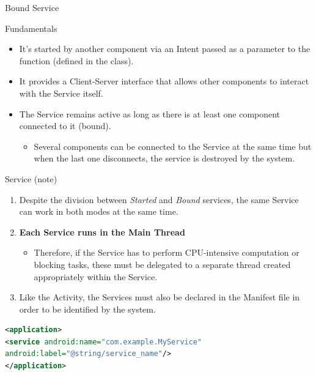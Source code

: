 \documentclass{beamer}
\begin{document}
  \begin{frame}{Bound Service}
    \begin{block}{Fundamentals}
      \begin{itemize}\itemsep10pt
        \item It's started by another component via an Intent passed as a
        parameter to the  function (defined in the  class).
        \item It provides a Client-Server interface that allows other components
        to interact with the Service itself.
        \item The Service remains active as long as there is at least one
        component connected to it (bound).
        \begin{itemize}
          \item Several components can be connected to the Service at the same
          time but when the last one disconnects, the service is destroyed by
          the system.
        \end{itemize}
      \end{itemize}
    \end{block}
  \end{frame}

  \begin{frame}[fragile]{Service (note)}
    \begin{block}{}
      \begin{enumerate}
        \item Despite the division between \textit{Started} and \textit{Bound}
        services, the same Service can work in both modes at the same time.
        \item \textbf{Each Service runs in the Main Thread}
      \begin{itemize}
        \item Therefore, if the Service has to perform CPU-intensive computation
        or blocking tasks, these must be delegated to a separate thread created
        appropriately within the Service.
      \end{itemize}
      \item Like the Activity, the Services must also be declared in the Manifest
      file in order to be identified by the system.
      \end{enumerate}
    \end{block}
    \begin{exampleblock}{}
      \begin{lstlisting}[language=XML]
<application>
<service android:name="com.example.MyService"
android:label="@string/service_name"/>
</application>
      \end{lstlisting}
    \end{exampleblock}
  \end{frame}
\end{document}
